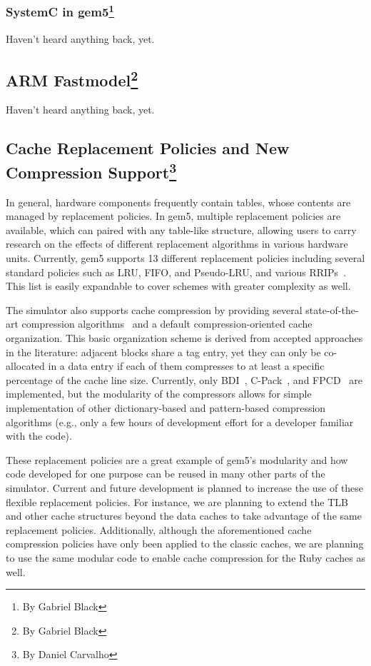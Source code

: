 \subsubsection[SystemC in gem5]{SystemC in gem5\footnote{By Gabriel Black}}

Haven't heard anything back, yet.

\subsection[ARM Fastmodel]{ARM Fastmodel\footnote{By Gabriel Black}}

Haven't heard anything back, yet.

\subsection[Cache Replacement Policies and New Compression Support]{Cache Replacement Policies and New Compression Support\footnote{By Daniel Carvalho}}

In general, hardware components frequently contain tables, whose contents are managed by replacement policies.
In gem5, multiple replacement policies are available, which can paired with any table-like structure, allowing users to carry research on the effects of different replacement algorithms in various hardware units.
Currently, gem5 supports 13 different replacement policies including several standard policies such as LRU, FIFO, and Pseudo-LRU, and various RRIPs~\cite{Jaleel2010rrip}.
This list is easily expandable to cover schemes with greater complexity as well.

The simulator also supports cache compression by providing several state-of-the-art compression algorithms~\cite{sardashti2015primer} and a default compression-oriented cache organization.
This basic organization scheme is derived from accepted approaches in the literature: adjacent blocks share a tag entry, yet they can only be co-allocated in a data entry if each of them compresses to at least a specific percentage of the cache line size.
Currently, only BDI~\cite{pekhimenko2012base}, C-Pack~\cite{chen2010c}, and FPCD~\cite{alameldeen2018opportunistic} are implemented, but the modularity of the compressors allows for simple implementation of other dictionary-based and pattern-based compression algorithms (e.g., only a few hours of development effort for a developer familiar with the code).

These replacement policies are a great example of gem5's modularity and how code developed for one purpose can be reused in many other parts of the simulator.
Current and future development is planned to increase the use of these flexible replacement policies.
For instance, we are planning to extend the TLB and other cache structures beyond the data caches to take advantage of the same replacement policies.
Additionally, although the aforementioned cache compression policies have only been applied to the classic caches, we are planning to use the same modular code to enable cache compression for the Ruby caches as well.

